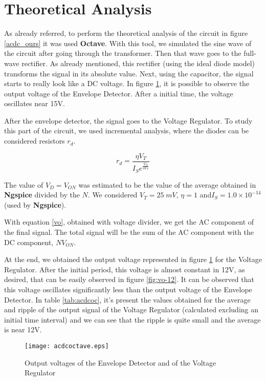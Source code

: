 \section{Theoretical Analysis}
\label{sec:analysis}

As already referred, to perform the theoretical analysis of the circuit in figure \ref{acdc_ours} it was used {\bf Octave}. With this tool, we simulated the sine wave of the circuit after going through the transformer. Then that wave goes to the full-wave rectifier. As already mentioned, this rectifier (using the ideal diode model) transforms the signal in its absolute value. Next, using the capacitor, the signal starts to really look like a DC voltage. In figure \ref{fig:acdcoc}, it is possible to observe the output voltage of the Envelope Detector. After a initial time, the voltage oscillates near 15V.

After the envelope detector, the signal goes to the Voltage Regulator. To study this part of the circuit, we used incremental analysis, where the diodes can be considered resistors $r_d$.

\begin{equation}
        r_d = \frac{\eta V_T}{I_Se^{\frac{V_D}{\eta V_T}}}
        \label{rd}
\end{equation}

The value of $V_D = V_{ON}$ was estimated to be the value of the average obtained in {\bf Ngspice} divided by the $N$. We considered $V_T=25\;mV$, $\eta = 1$ and$I_S = 1.0 \times 10^{-14}$ (used by {\bf Ngspice}).

With equation \ref{vo}, obtained with voltage divider, we get the AC component of the final signal. The total signal will be the sum of the AC component with the DC component, $N V_{ON}$.

At the end, we obtained the output voltage represented in figure \ref{fig:acdcoc} for the Voltage Regulator. After the initial period, this voltage is almost constant in 12V, as desired, that can be easily observed in figure \ref{fig:vo-12}. It can be observed that this voltage oscillates significantly less than the output voltage of the Envelope Detector. In table \ref{tab:acdcoc}, it's present the values obtained for the average and ripple of the output signal of the Voltage Regulator (calculated excluding an initial time interval) and we can see that the ripple is quite small and the average is near 12V.

\begin{figure}[H]
  \centering
  \texttt{[image: acdcoctave.eps]}
  \caption{Output voltages of the Envelope Detector and of the Voltage Regulator}
  \label{fig:acdcoc}
\end{figure}

